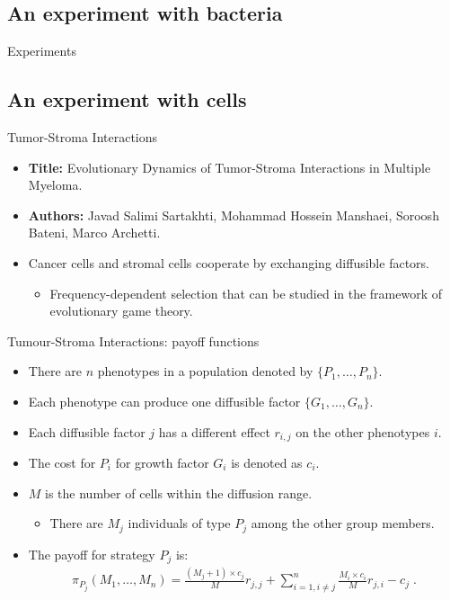 \subsection{An experiment with bacteria}

\begin{frame}{Experiments}
    
\end{frame}

\subsection{An experiment with cells}

\begin{frame}{Tumor-Stroma Interactions}

    \begin{itemize}
        \item \textbf{Title:} Evolutionary Dynamics of Tumor-Stroma Interactions in Multiple Myeloma.
        \item \textbf{Authors:} Javad Salimi Sartakhti, Mohammad Hossein Manshaei, Soroosh Bateni, Marco Archetti.
        \item Cancer cells and stromal cells cooperate by exchanging diffusible factors.
        \begin{itemize}
            \item Frequency-dependent selection that can be studied in the framework of evolutionary game theory.
        \end{itemize}
    \end{itemize}
    
\end{frame}

\begin{frame}{Tumour-Stroma Interactions: payoff functions}
    \begin{itemize}
        \item There are $n$ phenotypes in a population denoted by $\{ P_1, \ldots, P_n \}$.
        \item Each phenotype can produce one diffusible factor $\{ G_1, \ldots, G_n \}$.
        \item Each diffusible factor $j$ has a different effect $r_{i,j}$ on the other phenotypes $i$.
        \item The cost for $P_i$ for growth factor $G_i$ is denoted as $c_i$.
        \item $M$ is the number of cells within the diffusion range.
        \begin{itemize}
            \item There are $M_j$ individuals of type $P_j$ among the other group members.
        \end{itemize}
        \item The payoff for strategy $P_j$ is:
        \begin{align*}
            \pi_{P_j}(M_1,\ldots,M_n)=\frac{(M_j+1)\times c_j}{M}r_{j,j} + \sum_{i=1, i \neq j}^n \frac{M_i \times c_i}{M}r_{j,i} - c_j \;.
        \end{align*}
    \end{itemize}
\end{frame}

